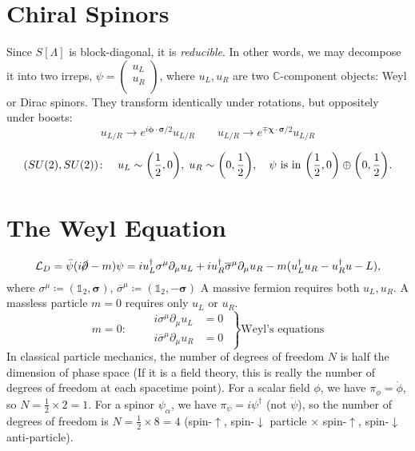 
\section{Chiral Spinors}%
\label{sec:chiral_spinors}

Since $S[\Lambda]$ is block-diagonal, it is \emph{reducible}.
In other words, we may decompose it into two irreps, $\psi = 
\begin{pmatrix}
u_L \\
u_{R} \\
\end{pmatrix}
$, where $u_{L} , u_{R}$ are two $\mathbb{C}$-component objects: Weyl or Dirac spinors. They transform identically under rotations, but oppositely under boosts:
\begin{equation} \label{eq:15-1}
u_{L/R} \to e^{i \boldsymbol\phi \cdot \boldsymbol \sigma / 2} u_{L/R} \qquad
u_{L/R} \to e^{\mp\boldsymbol \chi \cdot \boldsymbol \sigma / 2} u_{L/R}
\end{equation}

\begin{equation}
  (SU(2) , SU(2)) \colon \quad u_L \sim \qty(\frac{1}{2}, 0),\; u_R \sim \qty(0, \frac{1}{2}),\quad \psi \text{ is in } \qty(\frac{1}{2}, 0) \oplus \qty(0, \frac{1}{2}).
\end{equation}

\section{The Weyl Equation}%
\label{sec:the_weyl_equation}

\begin{equation}
  \mathcal{L}_D = \bar \psi (i \cancel{\partial} - m) \psi = i u^{\dagger}_L \sigma^{\mu} \partial_{\mu} u_L + i u_R^{\dagger} \overline{\sigma}^{\mu} \partial_{\mu} u_R - m(u_L^{\dagger} u_R - u_R^{\dagger} u-L),
\end{equation}
where $\sigma^{\mu} \coloneqq (\mathbb{1}_2, \boldsymbol\sigma)$, $\overline{\sigma}^{\mu} \coloneqq (\mathbb{1}_2, -\boldsymbol\sigma)$
A massive fermion requires both $u_L, u_R$. A massless particle $m = 0$ requires only $u_L$ or $u_R$.
\begin{equation}
  m = 0: \qquad
  \left.
  \begin{aligned}
    i \sigma^{\mu} \partial_{\mu} u_L &= 0 \\
    i \overline{\sigma}^{\mu} \partial_{\mu} u_R &= 0
  \end{aligned}
  \;
  \right\}
  \text{Weyl's equations}
\end{equation}
In classical particle mechanics, the number of degrees of freedom $N$ is half the dimension of phase space
(If it is a field theory, this is really the number of degrees of freedom at each spacetime point).
For a scalar field $\phi$, we have $\pi_\phi = \dot\phi$, so $N = \frac{1}{2} \times 2 = 1$.
For a spinor $\psi_{\alpha}$, we have $\pi_{\psi} = i \psi^{\dagger}$ (not $\dot{\psi}$), so the number of degrees of freedom is $N = \frac{1}{2} \times 8 = 4$ (spin-$\uparrow$, spin-$\downarrow$ particle $\times$ spin-$\uparrow$, spin-$\downarrow$ anti-particle).

